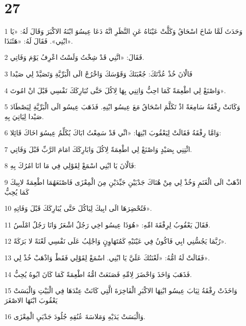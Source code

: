 \chapter{27}

\par 1 وَحَدَثَ لَمَّا شَاخَ اسْحَاقُ وَكَلَّتْ عَيْنَاهُ عَنِ النَّظَرِ انَّهُ دَعَا عِيسُوَ ابْنَهُ الاكْبَرَ وَقَالَ لَهُ: «يَا ابْنِي». فَقَالَ لَهُ: «هَئَنَذَا».
\par 2 فَقَالَ: «انَّنِي قَدْ شِخْتُ وَلَسْتُ اعْرِفُ يَوْمَ وَفَاتِي.
\par 3 فَالْانَ خُذْ عُدَّتَكَ: جُعْبَتَكَ وَقَوْسَكَ وَاخْرُجْ الَى الْبَرِّيَّةِ وَتَصَيَّدْ لِي صَيْدا
\par 4 وَاصْنَعْ لِي اطْعِمَةً كَمَا احِبُّ وَاتِنِي بِهَا لِاكُلَ حَتَّى تُبَارِكَكَ نَفْسِي قَبْلَ انْ امُوتَ».
\par 5 وَكَانَتْ رِفْقَةُ سَامِعَةً اذْ تَكَلَّمَ اسْحَاقُ مَعَ عِيسُو ابْنِهِ. فَذَهَبَ عِيسُو الَى الْبَرِّيَّةِ لِيَصْطَادَ صَيْدا لِيَاتِيَ بِهِ.
\par 6 وَامَّا رِفْقَةُ فَقَالَتْ لِيَعْقُوبَ ابْنِهَا: «انِّي قَدْ سَمِعْتُ ابَاكَ يُكَلِّمُ عِيسُوَ اخَاكَ قَائِلا:
\par 7 ائْتِنِي بِصَيْدٍ وَاصْنَعْ لِي اطْعِمَةً لِاكُلَ وَابَارِكَكَ امَامَ الرَّبِّ قَبْلَ وَفَاتِي.
\par 8 فَالْانَ يَا ابْنِي اسْمَعْ لِقَوْلِي فِي مَا انَا امُرُكَ بِهِ:
\par 9 اذْهَبْ الَى الْغَنَمِ وَخُذْ لِي مِنْ هُنَاكَ جَدْيَيْنِ جَيِّدَيْنِ مِنَ الْمِعْزَى فَاصْنَعَهُمَا اطْعِمَةً لابِيكَ كَمَا يُحِبُّ
\par 10 فَتُحْضِرَهَا الَى ابِيكَ لِيَاكُلَ حَتَّى يُبَارِكَكَ قَبْلَ وَفَاتِهِ».
\par 11 فَقَالَ يَعْقُوبُ لِرِفْقَةَ امِّهِ: «هُوَذَا عِيسُو اخِي رَجُلٌ اشْعَرُ وَانَا رَجُلٌ امْلَسُ.
\par 12 رُبَّمَا يَجُسُّنِي ابِي فَاكُونُ فِي عَيْنَيْهِ كَمُتَهَاوِنٍ وَاجْلِبُ عَلَى نَفْسِي لَعْنَةً لا بَرَكَةً».
\par 13 فَقَالَتْ لَهُ امُّهُ: «لَعْنَتُكَ عَلَيَّ يَا ابْنِي. اسْمَعْ لِقَوْلِي فَقَطْ وَاذْهَبْ خُذْ لِي».
\par 14 فَذَهَبَ وَاخَذَ وَاحْضَرَ لِامِّهِ فَصَنَعَتْ امُّهُ اطْعِمَةً كَمَا كَانَ ابُوهُ يُحِبُّ.
\par 15 وَاخَذَتْ رِفْقَةُ ثِيَابَ عِيسُو ابْنِهَا الاكْبَرِ الْفَاخِرَةَ الَّتِي كَانَتْ عِنْدَهَا فِي الْبَيْتِ وَالْبَسَتْ يَعْقُوبَ ابْنَهَا الاصْغَرَ
\par 16 وَالْبَسَتْ يَدَيْهِ وَمَلاسَةَ عُنُقِهِ جُلُودَ جَدْيَيِ الْمِعْزَى.
